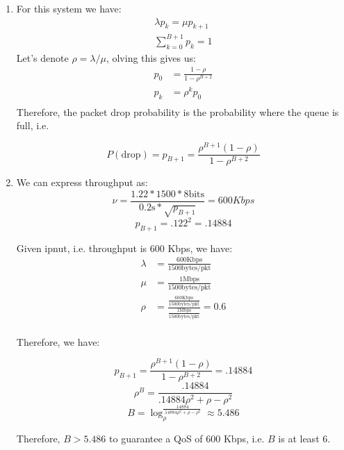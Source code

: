 \begin{enumerate}
      \item For this system we have:
            \begin{align*}
                  \lambda p_{k} = \mu p_{k+1} \\
                  \sum_{k=0}^{B+1} p_k = 1
            \end{align*}
            Let's denote $\rho = \lambda / \mu$, olving this gives us:
            \begin{align*}
                  p_0 & = \frac{1-\rho}{1-\rho^{B+2}} \\
                  p_k & = \rho^kp_0                   \\
            \end{align*}
            Therefore, the packet drop probability is the probability where the queue is full, i.e.

            $$P(\text{drop}) = p_{B+1} = \frac{\rho^{B+1}(1-\rho)}{1 - \rho^{B+2}}$$

      \item We can express throughput as:
            $$\nu = \frac{1.22 * 1500 * 8 \text{bits}}{0.2 \text{s} * \sqrt{p_{B+1}}} = 600 Kbps $$
            $$p_{B+1} = .122^2 = .14884$$

            Given ipnut, i.e. throughput is 600 Kbps, we have:
            \begin{align*}
                  \lambda & = \frac{600 \text{Kbps}}{1500 \text{bytes/pkt}}                                                              \\
                  \mu     & = \frac{1 \text{Mbps}}{1500 \text{bytes/pkt}}                                                                \\
                  \rho    & = \frac{ \frac{600 \text{Kbps}}{1500 \text{bytes/pkt}}}{ \frac{1 \text{Mbps}}{1500 \text{bytes/pkt}} } = 0.6 \\
            \end{align*}

            Therefore, we have:

            $$p_{B+1} = \frac{\rho^{B+1}(1-\rho)}{1 - \rho^{B+2}} = .14884$$
            $$\rho^B = \frac{.14884}{.14884 \rho^2 + \rho - \rho^2}$$
            $$B = \log_\rho^\frac{.14884}{.14884 \rho^2 + \rho - \rho^2} \approx 5.486$$

            Therefore, $B > 5.486$ to guarantee a QoS of 600 Kbps,  i.e. $B$ is at least 6.
\end{enumerate}